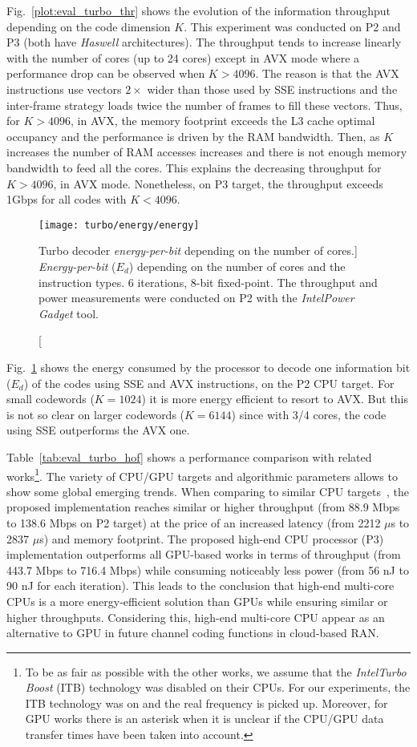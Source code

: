 Fig.~\ref{plot:eval_turbo_thr} shows the evolution of the information throughput
depending on the code dimension $K$. This experiment was conducted on P2 and P3
(both have \emph{ Haswell} architectures). The throughput tends to increase
linearly with the number of cores (up to 24 cores) except in AVX mode where a
performance drop can be observed when $K > 4096$. The reason is that the AVX
instructions use vectors $2\times$ wider than those used by SSE instructions and
the inter-frame strategy loads twice the number of frames to fill these vectors.
Thus, for $K > 4096$, in AVX, the memory footprint exceeds the L3 cache optimal
occupancy and the performance is driven by the RAM bandwidth. Then, as $K$
increases the number of RAM accesses increases and there is not enough memory
bandwidth to feed all the cores. This explains the decreasing throughput for
$K > 4096$, in AVX mode. Nonetheless, on P3 target, the throughput exceeds 1Gbps
for all codes with $K<4096$.

\begin{figure}[htp]
  \centering
  \texttt{[image: turbo/energy/energy]}
  \caption
    [Turbo decoder \emph{energy-per-bit} depending on the number of cores.]
    {\emph{Energy-per-bit} ($E_d$) depending on the number of cores and the
    instruction types. 6 iterations, 8-bit fixed-point. The throughput and power
    measurements were conducted on P2 with the
    \emph{Intel\R Power Gadget} tool.}
  \label{plot:eval_turbo_energy}
\end{figure}

Fig.~\ref{plot:eval_turbo_energy} shows the energy consumed by the processor to
decode one information bit ($E_d$) of the codes using SSE and AVX instructions,
on the P2 CPU target. For small codewords ($K=1024$) it is more energy efficient
to resort to AVX. But this is not so clear on larger codewords ($K=6144$) since
with 3/4 cores, the code using SSE outperforms the AVX one.

Table~\ref{tab:eval_turbo_hof} shows a performance comparison with related
works\footnote{To be as fair as possible with the other works, we assume that
the \emph{Intel\R Turbo Boost} (ITB) technology was disabled on their CPUs. For
our experiments, the ITB technology was on and the real frequency is picked up.
Moreover, for GPU works there is an asterisk when it is unclear if the CPU/GPU
data transfer times have been taken into account.}. The variety of CPU/GPU
targets and algorithmic parameters allows to show some global emerging trends.
When comparing to similar CPU targets~\cite{Zhang2012,Wu2013}, the proposed
implementation reaches similar or higher throughput (from 88.9 Mbps to 138.6
Mbps on P2 target) at the price of an increased latency (from 2212 $\mu$s to
2837 $\mu$s) and memory footprint. The proposed high-end CPU processor (P3)
implementation outperforms all GPU-based works in terms of throughput (from
443.7 Mbps to 716.4 Mbps) while consuming noticeably less power (from 56 nJ to
90 nJ for each iteration). This leads to the conclusion that high-end multi-core
CPUs is a more energy-efficient solution than GPUs while ensuring similar or
higher throughputs. Considering this, high-end multi-core CPU appear as an
alternative to GPU in future channel coding functions in cloud-based RAN.

